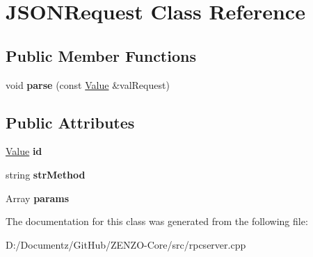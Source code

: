 \hypertarget{class_j_s_o_n_request}{}\section{J\+S\+O\+N\+Request Class Reference}
\label{class_j_s_o_n_request}
\subsection*{Public Member Functions}
\begin{DoxyCompactItemize}
\item 
\mbox{\label{class_j_s_o_n_request_a5c68b21e7f1bead9fd39f27208446add}} 
void {\bfseries parse} (const \mbox{\hyperlink{classjson__spirit_1_1_value__impl}{Value}} \&val\+Request)
\end{DoxyCompactItemize}
\subsection*{Public Attributes}
\begin{DoxyCompactItemize}
\item 
\mbox{\label{class_j_s_o_n_request_a511230ee04a067551bafd1ccd9462237}} 
\mbox{\hyperlink{classjson__spirit_1_1_value__impl}{Value}} {\bfseries id}
\item 
\mbox{\label{class_j_s_o_n_request_ace58495b259be69fb4b6e256a42c9d5f}} 
string {\bfseries str\+Method}
\item 
\mbox{\label{class_j_s_o_n_request_a92b1bcc9caa57cec01ccdb498a2b3666}} 
Array {\bfseries params}
\end{DoxyCompactItemize}


The documentation for this class was generated from the following file\+:\begin{DoxyCompactItemize}
\item 
D\+:/\+Documentz/\+Git\+Hub/\+Z\+E\+N\+Z\+O-\/\+Core/src/rpcserver.\+cpp\end{DoxyCompactItemize}
